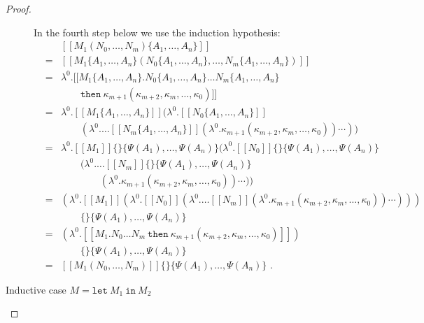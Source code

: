 \documentclass[a4paper,11pt,draft]{article}
\newcommand{\kw}[1]{\mathtt{#1}}
\begin{document}
\begin{proof}
\begin{description}
  In the fourth step below we use the induction hypothesis:
  \begin{eqnarray*}
    &   & [\![M_{1}(N_{0}, \ldots, N_{m})\{A_{1}, \ldots, A_{n}\}]\!] \\
    & = & [\![M_{1}\{A_{1}, \ldots, A_{n}\}(N_{0}\{A_{1}, \ldots, A_{n}\}, \ldots, N_{m}\{A_{1}, \ldots, A_{n}\})]\!] \\
    & = & \lambda^{0}.[\![M_{1}\{A_{1}, \ldots, A_{n}\}.N_{0}\{A_{1}, \ldots, A_{n}\} \ldots N_{m}\{A_{1}, \ldots, A_{n}\} \: \\
    &   & \qquad \kw{then} \: \kappa_{m+1}(\kappa_{m+2}, \kappa_{m}, \ldots, \kappa_{0})]\!] \\
    & = & \lambda^{0}.[\![M_{1}\{A_{1}, \ldots, A_{n}\}]\!](\lambda^{0}.[\![N_{0}\{A_{1}, \ldots, A_{n}\}]\!] \\
    &   & \qquad (\lambda^{0}. \ldots [\![N_{m}\{A_{1}, \ldots, A_{n}\}]\!](\lambda^{0}.\kappa_{m+1}(\kappa_{m+2}, \kappa_{m}, \ldots, \kappa_{0})) \cdots )) \\
    & = & \lambda^{0}.[\![M_{1}]\!]\{\}\{\Psi(A_{1}), \ldots, \Psi(A_{n})\}(\lambda^{0}.[\![N_{0}]\!]\{\}\{\Psi(A_{1}), \ldots, \Psi(A_{n})\} \\
    &   & \qquad (\lambda^{0}. \ldots [\![N_{m}]\!]\{\}\{\Psi(A_{1}), \ldots, \Psi(A_{n})\} \\
    &   & \qquad \qquad (\lambda^{0}.\kappa_{m+1}(\kappa_{m+2}, \kappa_{m}, \ldots, \kappa_{0})) \cdots )) \\ %
    & = & (\lambda^{0}.[\![M_{1}]\!](\lambda^{0}.[\![N_{0}]\!](\lambda^{0}. \ldots [\![N_{m}]\!](\lambda^{0}.\kappa_{m+1}(\kappa_{m+2}, \kappa_{m}, \ldots, \kappa_{0})) \cdots ))) \\
    &   & \qquad \{\}\{\Psi(A_{1}), \ldots, \Psi(A_{n})\} \\
    & = & (\lambda^{0}.[\![M_{1}.N_{0} \ldots N_{m} \: \kw{then} \: \kappa_{m+1}(\kappa_{m+2}, \kappa_{m}, \ldots, \kappa_{0})]\!]) \\
    &   & \qquad \{\}\{\Psi(A_{1}), \ldots, \Psi(A_{n})\} \\
    & = & [\![M_{1}(N_{0}, \ldots, N_{m})]\!]\{\}\{\Psi(A_{1}), \ldots, \Psi(A_{n})\} \text{ .}
  \end{eqnarray*}

\item[\sffamily Inductive case $M = \kw{let} \: M_{1} \: \kw{in} \: M_{2}$]\hfill


\end{description}
\end{proof}
\end{document}
